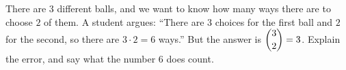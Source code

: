There are $3$ different balls, and we want to know how many ways there are to choose $2$ of them. A student argues: ``There are $3$ choices for the first ball and $2$ for the second, so there are $3\cdot2=6$ ways.'' But the answer is $\dbinom{3}{2}=3$. Explain the error, and say what the number $6$ does count.
